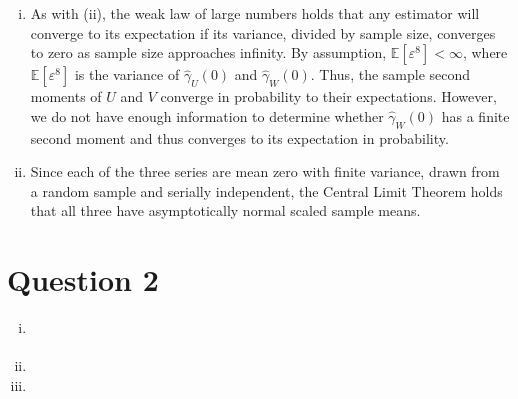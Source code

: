 \documentclass{article}
\newcommand{\eps}{\varepsilon}
\newcommand{\E}[1]{\mathbb{E}\left[#1\right]}%
\begin{document}
\begin{enumerate}[(i)]
	\item As with (ii), the weak law of large numbers holds that any estimator will converge to its expectation if its variance, divided by sample size, converges to zero as sample size approaches infinity. By assumption, ${\E{\eps^8}<\infty}$, where $\E{\eps^8}$ is the variance of $\hat{\gamma}_U(0)$ and $\hat{\gamma}_W(0)$. Thus, the sample second moments of $U$ and $V$ converge in probability to their expectations. However, we do not have enough information to determine whether $\hat{\gamma}_W(0)$ has a finite second moment and thus converges to its expectation in probability.
	
	\item Since each of the three series are mean zero with finite variance, drawn from a random sample and serially independent, the Central Limit Theorem holds that all three have asymptotically normal scaled sample means.
	
\end{enumerate}



\section*{Question 2}

\begin{enumerate}[(i)]
	\item 
		\begin{center}
			
		\end{center}
	
	\item 
	
	\item 
	
\end{enumerate}




\end{document}
